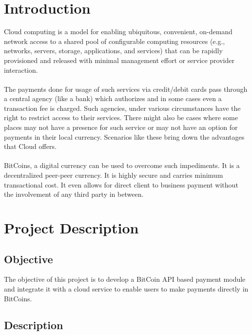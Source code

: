 \documentclass[a4page,12pt]{article}
\begin{document}
\section{Introduction}
Cloud computing is a model for enabling ubiquitous, convenient, on-demand network access to a shared pool of configurable computing resources (e.g., networks, servers, storage, applications, and services) that can be rapidly provisioned and released with minimal management effort or service provider interaction\cite{nist}.\\\\
The payments done for usage of such services via credit/debit cards pass through a central agency (like a bank) which authorizes and in some cases even a transaction fee is charged. Such agencies, under various circumstances have the right to restrict access to their services. There might also be cases where some places may not have a presence for such service or may not have an option for payments in their local currency. Scenarios like these bring down the advantages that Cloud offers.
\\\\
BitCoins, a digital currency can be used to overcome such impediments. It is a decentralized peer-peer currency. It is highly secure and carries minimum transactional cost. It even allows for direct client to business payment without the involvement of any third party in between.\\
\section{Project Description}
\vspace{0.2 in}
\subsection{Objective}
The objective of this project is to develop a BitCoin API based payment module and integrate it with a cloud service to enable users to make payments directly in BitCoins.
\vspace{0.2 in}
\subsection{Description}
\end{document}
